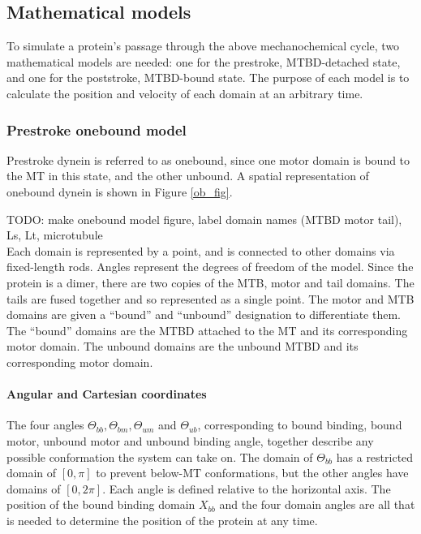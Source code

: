 \documentclass[10pt]{article} %
\begin{document}
\subsection{Mathematical models}
To simulate a protein's passage through the above mechanochemical cycle, two mathematical models are needed: one for the prestroke, MTBD-detached state, and one for the poststroke, MTBD-bound state. The purpose of each model is to calculate the position and velocity of each domain at an arbitrary time.\\

\subsubsection{Prestroke onebound model}
Prestroke dynein is referred to as onebound, since one motor domain is bound to the MT in this state, and the other unbound. A spatial representation of onebound dynein is shown in Figure \ref{ob_fig}. 


TODO: make onebound model figure, label domain names (MTBD motor tail), Ls, Lt, microtubule\\

Each domain is represented by a point, and is connected to other domains via fixed-length rods. Angles represent the degrees of freedom of the model. Since the protein is a dimer, there are two copies of the MTB, motor and tail domains. The tails are fused together and so represented as a single point. The motor and MTB domains are given a ``bound'' and ``unbound'' designation to differentiate them. The ``bound'' domains are the MTBD attached to the MT and its corresponding motor domain. The unbound domains are the unbound MTBD and its corresponding motor domain.\\

\paragraph{Angular and Cartesian coordinates}

The four angles $\Theta_{bb}, \Theta_{bm}, \Theta_{um}$ and $\Theta_{ub}$, corresponding to bound binding, bound motor, unbound motor and unbound binding angle, together describe any possible conformation the system can take on. The domain of $\Theta_{bb}$ has a restricted domain of $[0,\pi]$ to prevent below-MT conformations, but the other angles have domains of $[0,2\pi]$. Each angle is defined relative to the horizontal axis. The position of the bound binding domain $X_{bb}$ and the four domain angles are all that is needed to determine the position of the protein at any time.\\
\end{document}
